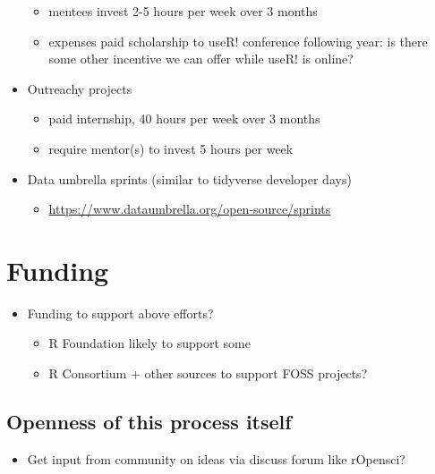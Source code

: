 \documentclass[]{book}
\providecommand{\tightlist}{%
  \setlength{\itemsep}{0pt}\setlength{\parskip}{0pt}}
\begin{document}
\begin{itemize}
  \begin{itemize}
  \tightlist
  \item
    mentees invest 2-5 hours per week over 3 months
  \item
    expenses paid scholarship to useR! conference following year: is there some other incentive we can offer while useR! is online?
  \end{itemize}
\item
  Outreachy projects

  \begin{itemize}
  \tightlist
  \item
    paid internship, 40 hours per week over 3 months
  \item
    require mentor(s) to invest 5 hours per week
  \end{itemize}
\item
  Data umbrella sprints (similar to tidyverse developer days)

  \begin{itemize}
  \tightlist
  \item
    \url{https://www.dataumbrella.org/open-source/sprints}
  \end{itemize}
\end{itemize}

\hypertarget{funding}{%
\chapter{Funding}\label{funding}}

\begin{itemize}
\tightlist
\item
  Funding to support above efforts?

  \begin{itemize}
  \tightlist
  \item
    R Foundation likely to support some
  \item
    R Consortium + other sources to support FOSS projects?
  \end{itemize}
\end{itemize}

\hypertarget{openness-of-this-process-itself}{%
\section{Openness of this process itself}\label{openness-of-this-process-itself}}

\begin{itemize}
\tightlist
\item
  Get input from community on ideas via discuss forum like rOpensci?
\end{itemize}
\end{document}
